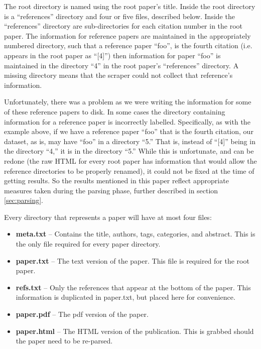 \documentclass[10pt, conference, compsocconf]{IEEEtran}
\begin{document}
The root directory is named using the root paper's title. Inside the root
directory is a ``references'' directory and four or five files, described
below. Inside the ``references'' directory are sub-directories for each
citation number in the root paper. The information for reference papers are
maintained in the appropriately numbered directory, such that a reference paper
``foo'', is the fourth citation (i.e. appears in the root paper as ``[4]'')
then information for paper ``foo'' is maintained in the directory ``4'' in the
root paper's ``references'' directory. A missing directory
means that the scraper could not collect that reference's information.

Unfortunately, there was a problem as we were writing the information for some
of these reference papers to disk. In some cases the directory containing information for a
reference paper is incorrectly labelled. Specifically, as with the example
above, if we have a reference paper ``foo'' that is the fourth citation, our
dataset, as is, may have ``foo'' in a directory ``5.'' That is, instead of
``[4]'' being in the directory ``4,'' it is in the directory ``5.'' While this
is unfortunate, and can be redone (the raw HTML for every root paper has
information that would allow the reference directories to be properly renamed),
it could not be fixed at the time of getting results. So the results mentioned
in this paper reflect appropriate measures taken during the parsing phase,
further described in section \ref{sec:parsing}.

Every directory that represents a paper will have at most four files:
\begin{itemize}
   \item \textbf{meta.txt}\footnotemark[1]{} -- Contains the title, authors,
                                                tags, categories, and abstract.
                                                This is the only file required
                                                for every paper directory.
   \item \textbf{paper.txt}\footnotemark[1]{} -- The text version of the paper.
                                                 This file is required for the
                                                 root paper.
   \item \textbf{refs.txt}\footnotemark[1]{} -- Only the references that appear
                                                at the bottom of the paper.
                                                This information is duplicated
                                                in paper.txt, but placed here
                                                for convenience.
   \item \textbf{paper.pdf} -- The pdf version of the paper.
   \item \textbf{paper.html} -- The HTML version of the publication. This is
                                grabbed should the paper need to be re-parsed.
\end{itemize}
\end{document}
